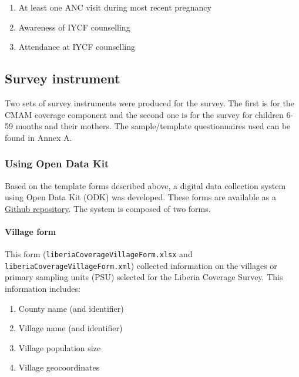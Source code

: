 \documentclass[12pt,a4paper]{article}
\let\oldparagraph\paragraph
\renewcommand{\paragraph}[1]{\oldparagraph{#1}\mbox{}}
\begin{document}
\begin{enumerate}
\def\labelenumi{\arabic{enumi}.}
\item
  At least one ANC visit during most recent pregnancy
\item
  Awareness of IYCF counselling
\item
  Attendance at IYCF counselling
\end{enumerate}

\hypertarget{survey-instrument}{%
\subsection{Survey instrument}\label{survey-instrument}}

Two sets of survey instruments were produced for the survey. The first is for the CMAM coverage component and the second one is for the survey for children 6-59 months and their mothers. The sample/template questionnaires used can be found in Annex A.

\hypertarget{using-open-data-kit}{%
\subsubsection{Using Open Data Kit}\label{using-open-data-kit}}

Based on the template forms described above, a digital data collection system using Open Data Kit (ODK) was developed. These forms are available as a \href{https://github.com/validmeasures/liberiaS3Mforms}{Github repository}. The system is composed of two forms.

\hypertarget{village-form}{%
\paragraph{Village form}\label{village-form}}

This form (\texttt{liberiaCoverageVillageForm.xlsx} and \texttt{liberiaCoverageVillageForm.xml}) collected information on the villages or primary sampling units (PSU) selected for the Liberia Coverage Survey. This information includes:

\begin{enumerate}
\def\labelenumi{\arabic{enumi}.}
\item
  County name (and identifier)
\item
  Village name (and identifier)
\item
  Village population size
\item
  Village geocoordinates
\end{enumerate}
\end{document}
